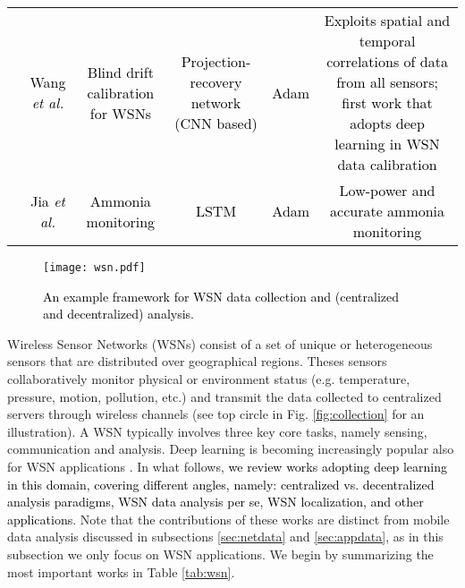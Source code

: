 \documentclass[journal,comsoc,letter]{IEEEtran}
\newcommand{\rev}[1]{\textcolor{black}{#1}}
\begin{document}
\begin{table*}[h!]
\begin{tabular}{|c|C{2CM}|C{3CM}|C{1.5CM}|C{2CM}|C{3.8CM}|}
                                                     & \rev{Wang \emph{et al.} \cite{wang2017deep3}}                 & \rev{Blind drift calibration for WSNs}                                                                  & \rev{Projection-recovery network (CNN based)} & \rev{Adam}                                                     & \rev{Exploits spatial and temporal correlations of data from all sensors; first work that adopts deep learning in WSN data calibration}       \\  
                                                     & \rev{Jia \emph{et al.} \cite{jia2018continuous}}                 & \rev{Ammonia monitoring}                                                                  & \rev{LSTM} & \rev{Adam}                                                     & \rev{Low-power and accurate ammonia monitoring}       \\\hline
\end{tabular}
\end{table*}



\begin{figure}[t]
\begin{center}
\texttt{[image: wsn.pdf]}
\caption{\label{fig:wsn} \rev{An example framework for WSN data collection and (centralized and decentralized) analysis.}}
\end{center}
\end{figure}

Wireless Sensor Networks (WSNs) consist of a set of unique or heterogeneous sensors that are distributed over geographical regions. Theses sensors collaboratively monitor physical or environment status (e.g. temperature, pressure, motion, pollution, etc.) and transmit the data collected to centralized servers through wireless channels (see top circle in Fig. \ref{fig:collection} for an illustration). A WSN typically involves three key core tasks, namely sensing, communication and analysis. 
Deep learning is becoming increasingly popular also for WSN applications \cite{kumar2019machine}. In what follows, \rev{we review works adopting deep learning in this domain, covering different angles, namely: centralized vs. decentralized analysis paradigms, WSN data analysis per se, WSN localization, and other applications}. Note that the contributions of these works are distinct from mobile data analysis discussed in subsections \ref{sec:netdata} and \ref{sec:appdata}, as in this subsection we only focus on WSN applications.  We begin by summarizing the most important works in Table \ref{tab:wsn}.
\end{document}

